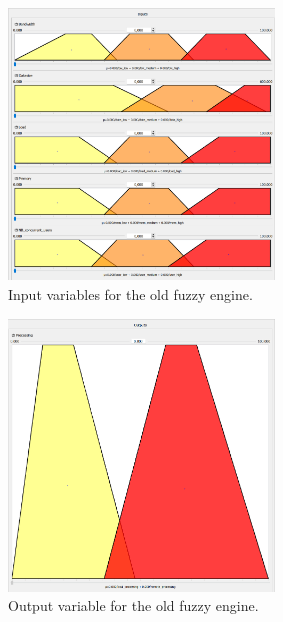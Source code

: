\begin{figure}[H]
	\centering
	\includegraphics[width=0.63\textwidth]{../images/old-vars-inputs.png}
	\caption{Input variables for the old fuzzy engine.}
	\label{fig:old-fuzzy-engine-inputs}
\end{figure}

\begin{figure}[H]
	\centering
	\includegraphics[width=0.63\textwidth]{../images/old-vars-output.png}
	\caption{Output variable for the old fuzzy engine.}
	\label{fig:old-fuzzy-engine-output}
\end{figure}

